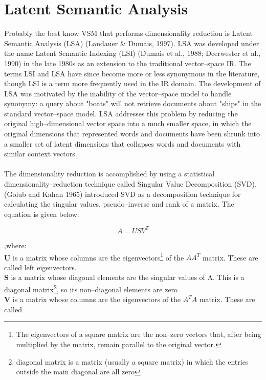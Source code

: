 \section{Latent Semantic Analysis}\label{LSA}
Probably the best know VSM that performs dimensionality reduction is Latent Semantic Analysis (LSA) 
(Landauer \& Dumais, 1997)\cite{landauerd97}. LSA was developed under the name Latent Semantic 
Indexing (LSI) (Dumais et al., 1988; Deerwester et al., 
1990)\cite{furnas1988iru}\cite{deerwester90indexing} in the late 1980s as an extension to the traditional 
vector--space IR. The terms LSI and LSA have since become  more or less synonymous in the literature, 
though LSI is a term more frequently used in the IR domain. The development of LSA was motivated by 
the inability of the vector--space model to handle synonymy: a query about "boats" will not retrieve 
documents about "ships" in the standard vector--space model. LSA addresses this problem by reducing 
the original high--dimensional vector space into a much smaller space, in which the original dimensions 
that represented words and documents have been shrunk into a smaller set of latent dimensions that 
collapses words and documents with similar context vectors.
\\\\
The dimensionality reduction is accomplished by using a statistical dimensionality--reduction technique 
called Singular Value Decomposition (SVD). (Golub and Kahan 1965)\cite{golub1965} introduced 
SVD as a decomposition technique for calculating the singular values, pseudo--inverse and rank of a 
matrix. The equation is given below:
\begin{center} 
\begin{equation}
 A = USV^{T}
\end{equation}
\end{center}
,where: 
\\\textbf{U} is a matrix whose columns are the eigenvectors\footnote{The eigenvectors of a square matrix 
are the non--zero vectors that, after being multiplied by the matrix, remain parallel to the original vector.} 
of the $AA^{T}$ matrix. These are called left eigenvectors.
\\\textbf{S} is a matrix whose diagonal elements are the singular values of A. This is a diagonal 
matrix\footnote{diagonal matrix is a matrix (usually a square matrix) in which the entries outside the main 
diagonal are all zero}, so its non--diagonal elements are zero
\\\textbf{V} is a matrix whose columns are the eigenvectors of the $A^{T}A$  matrix. These are called 
